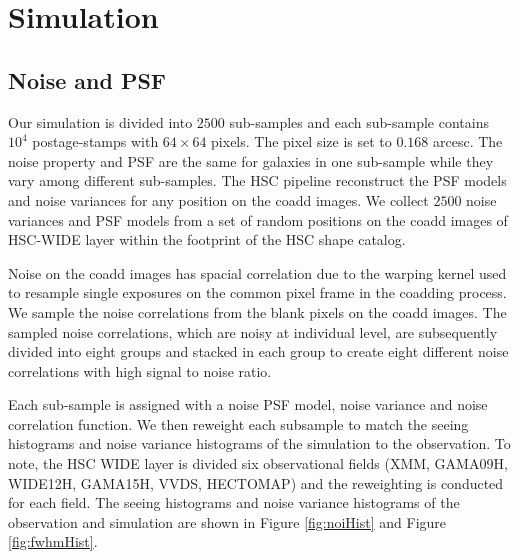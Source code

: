 \documentclass[useamsfonts]{pasj01}
\begin{document}
\title{}
\author{}%
\altaffiltext{}{}
\email{}


\maketitle


\begin{abstract}
\end{abstract}

\section{Simulation}

\subsection{Noise and PSF}

Our simulation is divided into $2500$ sub-samples and each sub-sample contains $10^4$ postage-stamps with
$64\times 64$ pixels. The pixel size is set to $0.168$ arcesc. The noise property and PSF are the same for
galaxies in one sub-sample while they vary among different sub-samples. The HSC pipeline reconstruct the PSF
models and noise variances for any position on the coadd images. We collect $2500$ noise variances and PSF
models from a set of random positions on the coadd images of HSC-WIDE layer within the footprint of the HSC
shape catalog.

Noise on the coadd images has spacial correlation due to the warping kernel used to resample single exposures
on the common pixel frame in the coadding process. We sample the noise correlations from the blank pixels on
the coadd images. The sampled noise correlations, which are noisy at individual level, are subsequently divided
into eight groups and stacked in each group to create eight different noise correlations with high signal to
noise ratio.

Each sub-sample is assigned with a noise PSF model, noise variance and noise correlation function. We then reweight
each subsample to match the seeing histograms and noise variance histograms of the simulation to the observation.
To note, the HSC WIDE layer is divided six observational fields (XMM, GAMA09H, WIDE12H, GAMA15H, VVDS, HECTOMAP)
and the reweighting is conducted for each field. The seeing histograms and noise variance histograms of the
observation and simulation are shown in Figure \ref{fig:noiHist} and Figure \ref{fig:fwhmHist}.
\end{document}
